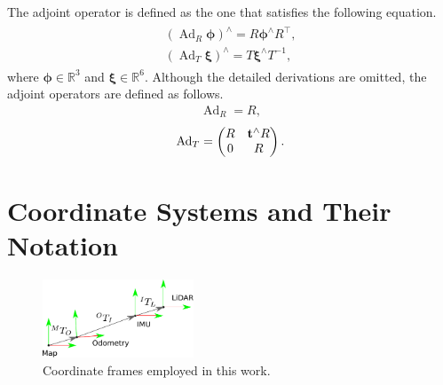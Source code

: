 The adjoint operator is defined as the one that satisfies the following equation.
%
\begin{align}
  \begin{gathered}
    \left( \operatorname{Ad}_{R} \boldsymbol \phi \right)^{\wedge} = R \boldsymbol \phi^{\wedge} R^{\top}, \\
%
    \left( \operatorname{Ad}_{T} \boldsymbol \xi \right)^{\wedge} = T \boldsymbol \xi^{\wedge} T^{-1},
  \end{gathered}
  \label{eq:adjoint}
\end{align}
%
where $\boldsymbol{\phi} \in \mathbb{R}^{3}$ and $\boldsymbol{\xi} \in \mathbb{R}^{6}$.
Although the detailed derivations are omitted, the adjoint operators are defined as follows.
%
\begin{align}
  \operatorname{Ad}_{R} = R,
  \label{eq:adjoint_so3}
\end{align}
%
\begin{align}
  \operatorname{Ad}_{T} = \left( \begin{matrix}
    R & {\bf t}^{\wedge} R \\
    0 & R
  \end{matrix} \right).
  \label{eq:adjoint_se3}
\end{align}







\section{Coordinate Systems and Their Notation}

\begin{figure}[!t]
  \centering
  \includegraphics[width=0.4\textwidth]{../figs/frames.pdf}
  \caption{Coordinate frames employed in this work.}
  \label{fig:frames}
\end{figure}

